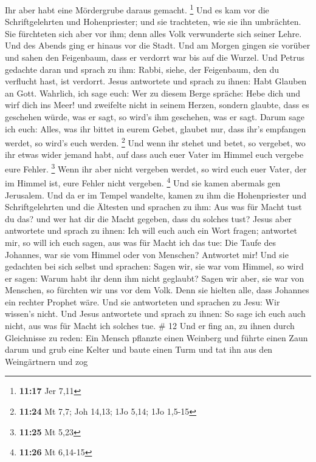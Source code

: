 Ihr aber habt eine Mördergrube daraus gemacht. \footnote{\textbf{11:17}
  Jer 7,11}  Und es kam vor die Schriftgelehrten und
Hohenpriester; und sie trachteten, wie sie ihn umbrächten. Sie
fürchteten sich aber vor ihm; denn alles Volk verwunderte sich seiner
Lehre.  Und des Abends ging er hinaus vor die Stadt.
 Und am Morgen gingen sie vorüber und sahen den Feigenbaum,
dass er verdorrt war bis auf die Wurzel.  Und Petrus
gedachte daran und sprach zu ihm: Rabbi, siehe, der Feigenbaum, den du
verflucht hast, ist verdorrt.  Jesus antwortete und sprach
zu ihnen: Habt Glauben an Gott.  Wahrlich, ich sage euch:
Wer zu diesem Berge spräche: Hebe dich und wirf dich ins Meer! und
zweifelte nicht in seinem Herzen, sondern glaubte, dass es geschehen
würde, was er sagt, so wird's ihm geschehen, was er sagt. 
Darum sage ich euch: Alles, was ihr bittet in eurem Gebet, glaubet nur,
dass ihr's empfangen werdet, so wird's euch werden. \footnote{\textbf{11:24}
  Mt 7,7; Joh 14,13; 1Jo 5,14; 1Jo 1,5-15}  Und wenn ihr
stehet und betet, so vergebet, wo ihr etwas wider jemand habt, auf dass
auch euer Vater im Himmel euch vergebe eure Fehler. \footnote{\textbf{11:25}
  Mt 5,23}  Wenn ihr aber nicht vergeben werdet, so wird
euch euer Vater, der im Himmel ist, eure Fehler nicht vergeben.
\footnote{\textbf{11:26} Mt 6,14-15}  Und sie kamen
abermals gen Jerusalem. Und da er im Tempel wandelte, kamen zu ihm die
Hohenpriester und Schriftgelehrten und die Ältesten  und
sprachen zu ihm: Aus was für Macht tust du das? und wer hat dir die
Macht gegeben, dass du solches tust?  Jesus aber antwortete
und sprach zu ihnen: Ich will euch auch ein Wort fragen; antwortet mir,
so will ich euch sagen, aus was für Macht ich das tue:  Die
Taufe des Johannes, war sie vom Himmel oder von Menschen? Antwortet mir!
 Und sie gedachten bei sich selbst und sprachen: Sagen wir,
sie war vom Himmel, so wird er sagen: Warum habt ihr denn ihm nicht
geglaubt?  Sagen wir aber, sie war von Menschen, so
fürchten wir uns vor dem Volk. Denn sie hielten alle, dass Johannes ein
rechter Prophet wäre.  Und sie antworteten und sprachen zu
Jesu: Wir wissen's nicht. Und Jesus antwortete und sprach zu ihnen: So
sage ich euch auch nicht, aus was für Macht ich solches tue. \# 12
 Und er fing an, zu ihnen durch Gleichnisse zu reden: Ein
Mensch pflanzte einen Weinberg und führte einen Zaun darum und grub eine
Kelter und baute einen Turm und tat ihn aus den Weingärtnern und zog
